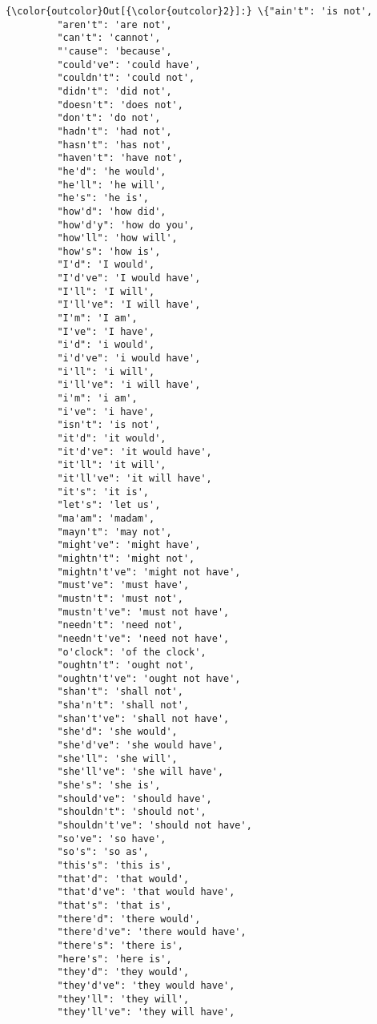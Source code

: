\documentclass[11pt]{article}
\begin{document}
\begin{Verbatim}[commandchars=\\\{\}]
{\color{outcolor}Out[{\color{outcolor}2}]:} \{"ain't": 'is not',
         "aren't": 'are not',
         "can't": 'cannot',
         "'cause": 'because',
         "could've": 'could have',
         "couldn't": 'could not',
         "didn't": 'did not',
         "doesn't": 'does not',
         "don't": 'do not',
         "hadn't": 'had not',
         "hasn't": 'has not',
         "haven't": 'have not',
         "he'd": 'he would',
         "he'll": 'he will',
         "he's": 'he is',
         "how'd": 'how did',
         "how'd'y": 'how do you',
         "how'll": 'how will',
         "how's": 'how is',
         "I'd": 'I would',
         "I'd've": 'I would have',
         "I'll": 'I will',
         "I'll've": 'I will have',
         "I'm": 'I am',
         "I've": 'I have',
         "i'd": 'i would',
         "i'd've": 'i would have',
         "i'll": 'i will',
         "i'll've": 'i will have',
         "i'm": 'i am',
         "i've": 'i have',
         "isn't": 'is not',
         "it'd": 'it would',
         "it'd've": 'it would have',
         "it'll": 'it will',
         "it'll've": 'it will have',
         "it's": 'it is',
         "let's": 'let us',
         "ma'am": 'madam',
         "mayn't": 'may not',
         "might've": 'might have',
         "mightn't": 'might not',
         "mightn't've": 'might not have',
         "must've": 'must have',
         "mustn't": 'must not',
         "mustn't've": 'must not have',
         "needn't": 'need not',
         "needn't've": 'need not have',
         "o'clock": 'of the clock',
         "oughtn't": 'ought not',
         "oughtn't've": 'ought not have',
         "shan't": 'shall not',
         "sha'n't": 'shall not',
         "shan't've": 'shall not have',
         "she'd": 'she would',
         "she'd've": 'she would have',
         "she'll": 'she will',
         "she'll've": 'she will have',
         "she's": 'she is',
         "should've": 'should have',
         "shouldn't": 'should not',
         "shouldn't've": 'should not have',
         "so've": 'so have',
         "so's": 'so as',
         "this's": 'this is',
         "that'd": 'that would',
         "that'd've": 'that would have',
         "that's": 'that is',
         "there'd": 'there would',
         "there'd've": 'there would have',
         "there's": 'there is',
         "here's": 'here is',
         "they'd": 'they would',
         "they'd've": 'they would have',
         "they'll": 'they will',
         "they'll've": 'they will have',

\end{Verbatim}
\end{document}
